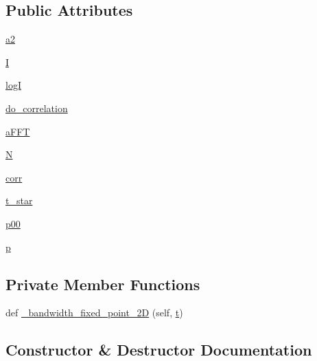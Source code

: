 \subsection*{Public Attributes}
\begin{DoxyCompactItemize}
\item 
\mbox{\hyperlink{classgetdist_1_1kde__bandwidth_1_1KernelOptimizer2D_a1b2e9466092f2e505511d965dba12e30}{a2}}
\item 
\mbox{\hyperlink{classgetdist_1_1kde__bandwidth_1_1KernelOptimizer2D_a256c18571e4fcc213440ebe81877c2f7}{I}}
\item 
\mbox{\hyperlink{classgetdist_1_1kde__bandwidth_1_1KernelOptimizer2D_a471cd12e4df1c749282e134b4d561cbc}{logI}}
\item 
\mbox{\hyperlink{classgetdist_1_1kde__bandwidth_1_1KernelOptimizer2D_aba1b0b161bbb71286e717e801ef2db1f}{do\+\_\+correlation}}
\item 
\mbox{\hyperlink{classgetdist_1_1kde__bandwidth_1_1KernelOptimizer2D_af2ccfb13df0d116ad73df5543fc11b0d}{a\+F\+FT}}
\item 
\mbox{\hyperlink{classgetdist_1_1kde__bandwidth_1_1KernelOptimizer2D_ac8f1ebf5f738720d50c486814c3d6462}{N}}
\item 
\mbox{\hyperlink{classgetdist_1_1kde__bandwidth_1_1KernelOptimizer2D_a53a353297fa18dc75ec417dc8d8f433d}{corr}}
\item 
\mbox{\hyperlink{classgetdist_1_1kde__bandwidth_1_1KernelOptimizer2D_ac89a32b2219020c91169fa768b878e22}{t\+\_\+star}}
\item 
\mbox{\hyperlink{classgetdist_1_1kde__bandwidth_1_1KernelOptimizer2D_a245222fa99a80216499088d5d1029122}{p00}}
\item 
\mbox{\hyperlink{classgetdist_1_1kde__bandwidth_1_1KernelOptimizer2D_a50ade95bba0f309d988d314f85a1844d}{p}}
\end{DoxyCompactItemize}
\subsection*{Private Member Functions}
\begin{DoxyCompactItemize}
\item 
def \mbox{\hyperlink{classgetdist_1_1kde__bandwidth_1_1KernelOptimizer2D_a4b4cbb301eb918bf8acdd2c318fe36ba}{\+\_\+bandwidth\+\_\+fixed\+\_\+point\+\_\+2D}} (self, \mbox{\hyperlink{plotcls_8m_aaccc9105df5383111407fd5b41255e23}{t}})
\end{DoxyCompactItemize}


\subsection{Constructor \& Destructor Documentation}
\mbox{\label{classgetdist_1_1kde__bandwidth_1_1KernelOptimizer2D_ad9bcba903d202021c28871300de3bede}} 
